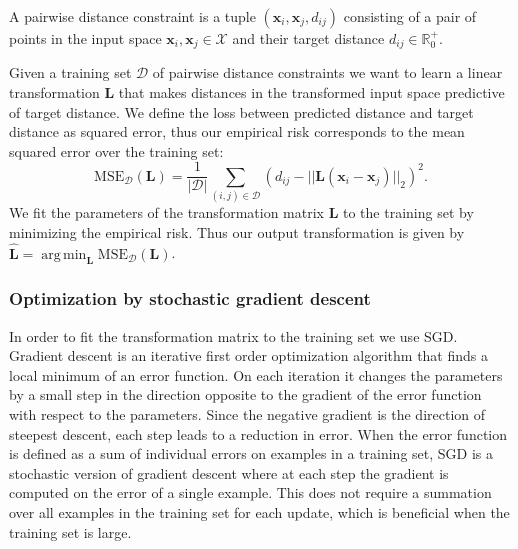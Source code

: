 \documentclass[a4paper,titlepage]{article}
\renewcommand{\vec}[1]{\mathbf{#1}}
\newcommand{\mat}[1]{\mathbf{#1}}
\DeclareMathOperator*{\argmin}{arg\,min}
\begin{document}
A pairwise distance constraint is a tuple $(\vec{x}_i, \vec{x}_j, d_{ij})$ consisting of a pair of points in the input space $\vec{x}_i, \vec{x}_j \in \mathcal{X}$ and their target distance $d_{ij} \in \mathbb{R}_0^+$. %

Given a training set $\mathcal{D}$ of pairwise distance constraints we want to learn a linear transformation $\mat{L}$ that makes distances in the transformed input space predictive of target distance. We define the loss between predicted distance and target distance as squared error, thus our empirical risk corresponds to the mean squared error over the training set:
\begin{equation}
\text{MSE}_\mathcal{D}(\mat{L}) = \frac{1}{|\mathcal{D}|}\sum_{(i,j) \in \mathcal{D}} \left ( d_{ij} - ||\mat{L} (\vec{x}_i - \vec{x}_j)||_2 \right)^2.
\label{eq:mse}
\end{equation}
We fit the parameters of the transformation matrix $\mat{L}$ to the training set by minimizing the empirical risk. Thus our output transformation is given by $\hat{\mat{L}} = \argmin_{\mat{L}} \text{MSE}_\mathcal{D}(\mat{L})$. 

\subsubsection{Optimization by stochastic gradient descent}

In order to fit the transformation matrix to the training set we use \acf{SGD}. Gradient descent is an iterative first order optimization algorithm that finds a local minimum of an error function. On each iteration it changes the parameters by a small step in the direction opposite to the gradient of the error function with respect to the parameters. Since the negative gradient is the direction of steepest descent, each step leads to a reduction in error. When the error function is defined as a sum of individual errors on examples in a training set, \ac{SGD} is a stochastic version of gradient descent where at each step the gradient is computed on the error of a single example. This does not require a summation over all examples in the training set for each update, which is beneficial when the training set is large. 
\end{document}
